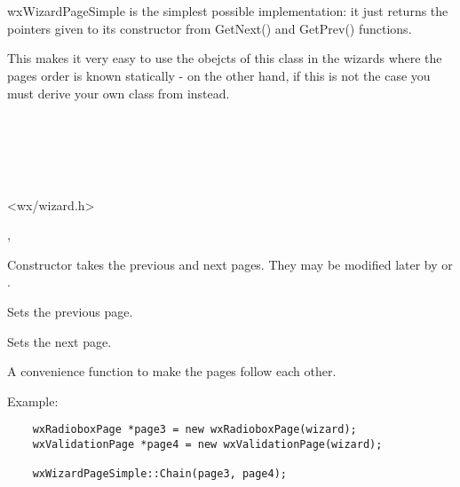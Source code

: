 \section{}\label{wxwizardpagesimple}

wxWizardPageSimple is the simplest possible 
 implementation: it just returns the
pointers given to its constructor from GetNext() and GetPrev() functions.

This makes it very easy to use the obejcts of this class in the wizards where
the pages order is known statically - on the other hand, if this is not the
case you must derive your own class from  
instead.


\\
\\
\\
\\


<wx/wizard.h>


, 


\label{wxwizardpagesimplewxwizardpagesimple}


Constructor takes the previous and next pages. They may be modified later by
 or 
.

\label{wxwizardpagesimplesetprev}


Sets the previous page.

\label{wxwizardpagesimplesetnext}


Sets the next page.

\label{wxwizardpagesimplechain}


A convenience function to make the pages follow each other.

Example:
\begin{verbatim}
    wxRadioboxPage *page3 = new wxRadioboxPage(wizard);
    wxValidationPage *page4 = new wxValidationPage(wizard);

    wxWizardPageSimple::Chain(page3, page4);
\end{verbatim}

